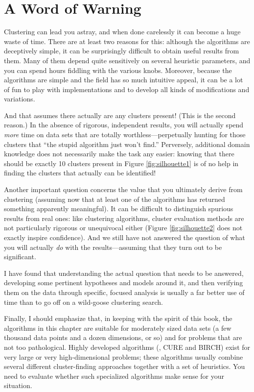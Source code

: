 \vspace*{-6pt}
\section{A Word of Warning}

 
Clustering can lead you astray, and when done carelessly it can become a
huge waste of time. There are at least two reasons for this: although
the algorithms are deceptively simple, it can be surprisingly
difficult to obtain useful results from them. Many of them depend
quite sensitively on several heuristic parameters, and you can spend
hours fiddling with the various knobs. Moreover, because the
algorithms are simple and the field has so much intuitive appeal, it
can be a lot of fun to play with implementations and to develop all
kinds of modifications and variations.

And that assumes there actually are any clusters present! (This is the
second reason.) In the absence of rigorous, independent results, you
will actually spend \emph{more} time on data sets that are totally
worthless---perpetually hunting for those clusters that ``the stupid
algorithm just won't find.'' Perversely, additional domain knowledge
does not necessarily make the task any easier: knowing that there
should be exactly 10 clusters present in Figure \ref{fig:silhouette1}
is of no help in finding the clusters that actually can be identified!

Another important question concerns the value that you ultimately
derive from clustering (assuming now that at least one of the
algorithms has returned something apparently meaningful). It can be
difficult to distinguish spurious results from real ones: like
clustering algorithms, cluster evaluation methods are not particularly
rigorous or unequivocal either (Figure \ref{fig:silhouette2} does not
exactly inspire confidence).  And we still have not answered the
question of what you will actually \emph{do} with the
results---assuming that they turn out to be significant.

I have found that understanding the actual question that needs to be
answered, developing some pertinent hypotheses and models around it,
and then verifying them on the data through specific, focused analysis
is usually a far better use of time than to go off on a wild-goose
clustering search.

Finally, I should emphasize that, in keeping with the spirit of this
book, the algorithms in this chapter are suitable for moderately sized
data sets (a few thousand data points and a dozen dimensions, or so)
and for problems that are not too pathological. Highly developed
algorithms (\eg, CURE and BIRCH) exist for very large or very
high-dimensional problems; these algorithms usually\vadjust{\pagebreak} combine several
different cluster-finding approaches together with a set of
heuristics. You need to evaluate whether such specialized algorithms
make sense for your situation.


